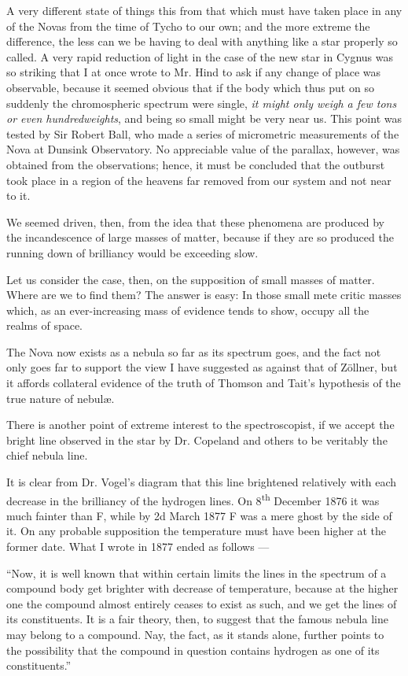 \documentclass[a4paper, 12pt, oneside, polutonikogreek, english]{article}
\begin{document}
A very different state of things this from that which must have taken place in any of the Novas from the time of Tycho to our own; and the more extreme the difference, the less can we be having to deal with anything like a star properly so called. A very rapid reduction of light in the case of the new star in Cygnus was so striking that I at once wrote to Mr. Hind to ask if any change of place was observable, because it seemed obvious that if the body which thus put on so suddenly the chromospheric spectrum were single, \emph{it might only weigh a few tons or even hundredweights}, and being so small might be very near us. This point was tested by Sir Robert Ball, who made a series of micrometric measurements of the Nova at Dunsink Observatory. No appreciable value of the parallax, however, was obtained from the observations; hence, it must be concluded that the outburst took place in a region of the heavens far removed from our system and not near to it.

We seemed driven, then, from the idea that these phenomena are produced by the incandescence of large masses of matter, because if they are so produced the running down of brilliancy would be exceeding slow.

Let us consider the case, then, on the supposition of small masses of matter. Where are we to find them? The answer is easy: In those small mete critic masses which, as an ever-increasing mass of evidence tends to show, occupy all the realms of space.

The Nova now exists as a nebula so far as its spectrum goes, and the fact not only goes far to support the view I have suggested as against that of Zöllner, but it affords collateral evidence of the truth of Thomson and Tait's hypothesis of the true nature of nebulæ.

There is another point of extreme interest to the spectroscopist, if we accept the bright line observed in the star by Dr. Copeland and others to be veritably the chief nebula line.

It is clear from Dr. Vogel's diagram that this line brightened relatively with each decrease in the brilliancy of the hydrogen lines. On 8\textsuperscript{th} December 1876 it was much fainter than F, while by 2d March 1877 F was a mere ghost by the side of it. On any probable supposition the temperature must have been higher at the former date. What I wrote in 1877 ended as follows ---

``Now, it is well known that within certain limits the lines in the spectrum of a compound body get brighter with decrease of temperature, because at the higher one the compound almost entirely ceases to exist as such, and we get the lines of its constituents. It is a fair theory, then, to suggest that the famous nebula line may belong to a compound. Nay, the fact, as it stands alone, further points to the possibility that the compound in question contains hydrogen as one of its constituents.''
\end{document}
